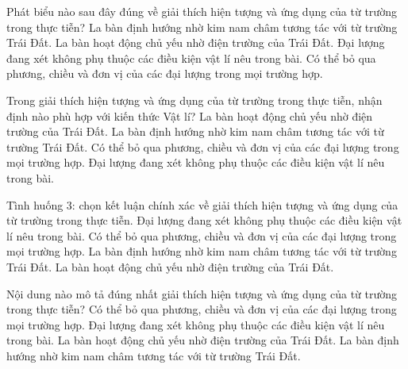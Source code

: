 \begin{ex}
Phát biểu nào sau đây đúng về giải thích hiện tượng và ứng dụng của từ trường trong thực tiễn?
\choice
{\True La bàn định hướng nhờ kim nam châm tương tác với từ trường Trái Đất.}
{La bàn hoạt động chủ yếu nhờ điện trường của Trái Đất.}
{Đại lượng đang xét không phụ thuộc các điều kiện vật lí nêu trong bài.}
{Có thể bỏ qua phương, chiều và đơn vị của các đại lượng trong mọi trường hợp.}
\end{ex}

\begin{ex}
Trong giải thích hiện tượng và ứng dụng của từ trường trong thực tiễn, nhận định nào phù hợp với kiến thức Vật lí?
\choice
{La bàn hoạt động chủ yếu nhờ điện trường của Trái Đất.}
{\True La bàn định hướng nhờ kim nam châm tương tác với từ trường Trái Đất.}
{Có thể bỏ qua phương, chiều và đơn vị của các đại lượng trong mọi trường hợp.}
{Đại lượng đang xét không phụ thuộc các điều kiện vật lí nêu trong bài.}
\end{ex}

\begin{ex}
Tình huống 3: chọn kết luận chính xác về giải thích hiện tượng và ứng dụng của từ trường trong thực tiễn.
\choice
{Đại lượng đang xét không phụ thuộc các điều kiện vật lí nêu trong bài.}
{Có thể bỏ qua phương, chiều và đơn vị của các đại lượng trong mọi trường hợp.}
{\True La bàn định hướng nhờ kim nam châm tương tác với từ trường Trái Đất.}
{La bàn hoạt động chủ yếu nhờ điện trường của Trái Đất.}
\end{ex}

\begin{ex}
Nội dung nào mô tả đúng nhất giải thích hiện tượng và ứng dụng của từ trường trong thực tiễn?
\choice
{Có thể bỏ qua phương, chiều và đơn vị của các đại lượng trong mọi trường hợp.}
{Đại lượng đang xét không phụ thuộc các điều kiện vật lí nêu trong bài.}
{La bàn hoạt động chủ yếu nhờ điện trường của Trái Đất.}
{\True La bàn định hướng nhờ kim nam châm tương tác với từ trường Trái Đất.}
\end{ex}

